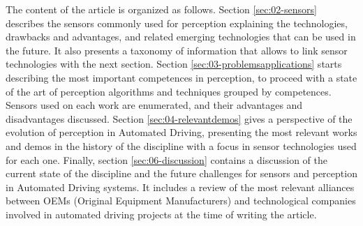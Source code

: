 The content of the article is organized as follows. Section 
\ref{sec:02-sensors} describes the sensors commonly used for perception 
explaining the technologies, drawbacks and advantages, and related emerging 
technologies that can be used in the future. It also presents a 
taxonomy of information that allows to link sensor technologies with the 
next section.
Section \ref{sec:03-problemsapplications} starts describing the most important 
competences in perception, to proceed with a state of the art of perception 
algorithms and techniques grouped by competences. Sensors used on each work
are enumerated, and their advantages and disadvantages discussed. 
Section \ref{sec:04-relevantdemos} gives a perspective of the evolution of
perception in Automated Driving, presenting the most relevant works and demos
in the history of the discipline with a focus in sensor technologies used for
each one. 
Finally, section \ref{sec:06-discussion} contains a discussion of the current
state of the discipline and the future challenges for sensors and perception in
Automated Driving systems. It includes a review of the most relevant alliances 
between OEMs (Original Equipment Manufacturers) and technological companies
involved in automated driving projects at the time of writing the article.
